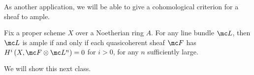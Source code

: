 \documentclass[../notes.tex]{subfiles}
\begin{document}
As another application, we will be able to give a cohomological criterion for a sheaf to ample.
\begin{theorem}
	Fix a proper scheme $X$ over a Noetherian ring $A$. For any line bundle $\mc L$, then $\mc L$ is ample if and only if each quasicoherent sheaf $\mc F$ has $H^i\left(X,\mc F\otimes\mc L^n\right)=0$ for $i>0$, for any $n$ sufficiently large.
\end{theorem}
We will show this next class.
\end{document}
